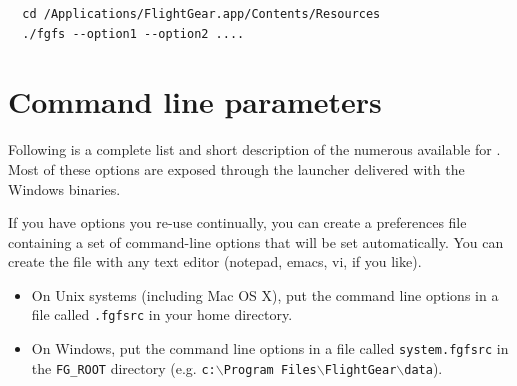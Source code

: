 \begin{verbatim}
  cd /Applications/FlightGear.app/Contents/Resources
  ./fgfs --option1 --option2 ....
\end{verbatim}


\section{Command line parameters\label{options}}
Following is a complete list and short description of the numerous 
available for \FlightGear{}. Most of these options are exposed through the \FlightGear{} launcher delivered with the
Windows binaries.

If you have options you re-use continually, you can create a preferences file
containing a set of command-line options that will be set automatically. You
can create the file with any text editor (notepad, emacs, vi, if you like).

\begin{itemize}
\item On Unix systems (including Mac OS X), put the command line options in a
file called \texttt{.fgfsrc} in your home directory.

\item On Windows, put the command line options in a file called \texttt{system.fgfsrc}
 in the \texttt{FG\_ROOT} directory (e.g. \texttt{c:$\backslash$Program Files$\backslash$FlightGear$\backslash$data}).
\end{itemize}


